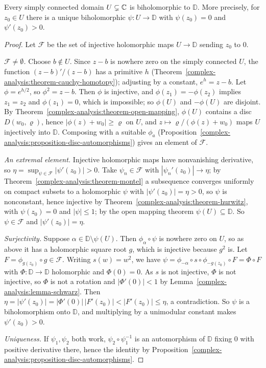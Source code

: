 \begin{theorem}\label{complex-analysis:theorem-riemann-mapping}
Every simply connected domain $U \subsetneq \mathbb{C}$ is biholomorphic to $\mathbb{D}$. More precisely, for $z_0 \in U$ there is a unique biholomorphic $\psi \colon U \to \mathbb{D}$ with $\psi(z_0) = 0$ and
$\psi'(z_0) > 0$.
\end{theorem}

\begin{proof}
Let $\mathcal{F}$ be the set of injective holomorphic maps $U \to \mathbb{D}$ sending $z_0$ to $0$.

\emph{$\mathcal{F} \neq \emptyset$.} Choose $b \notin U$. Since $z - b$ is nowhere zero on the simply connected $U$, the function $(z - b)'/(z - b)$ has a primitive $h$
(Theorem~\ref{complex-analysis:theorem-cauchy-homotopy}); adjusting by a constant, $e^{h} = z - b$. Let $\phi = e^{h/2}$, so $\phi^2 = z - b$. Then $\phi$ is injective, and $\phi(z_1) = -\phi(z_2)$ implies
$z_1 = z_2$ and $\phi(z_1) = 0$, which is impossible; so $\phi(U)$ and $-\phi(U)$ are disjoint. By Theorem~\ref{complex-analysis:theorem-open-mapping}, $\phi(U)$ contains a disc $D(w_0, \varrho)$, hence
$|\phi(z) + w_0| \geq \varrho$ on $U$, and $z \mapsto \varrho/(\phi(z) + w_0)$ maps $U$ injectively into $\mathbb{D}$. Composing with a suitable $\phi_a$
(Proposition~\ref{complex-analysis:proposition-disc-automorphisms}) gives an element of $\mathcal{F}$.

\emph{An extremal element.} Injective holomorphic maps have nonvanishing derivative, so $\eta = \sup_{\psi \in \mathcal{F}}|\psi'(z_0)| > 0$. Take $\psi_n \in \mathcal{F}$ with $|\psi_n'(z_0)| \to \eta$; by
Theorem~\ref{complex-analysis:theorem-montel} a subsequence converges uniformly on compact subsets to a holomorphic $\psi$ with $|\psi'(z_0)| = \eta > 0$, so $\psi$ is nonconstant, hence injective by
Theorem~\ref{complex-analysis:theorem-hurwitz}, with $\psi(z_0) = 0$ and $|\psi| \leq 1$; by the open mapping theorem $\psi(U) \subseteq \mathbb{D}$. So $\psi \in \mathcal{F}$ and $|\psi'(z_0)| = \eta$.

\emph{Surjectivity.} Suppose $\alpha \in \mathbb{D} \setminus \psi(U)$. Then $\phi_\alpha \circ \psi$ is nowhere zero on $U$, so as above it has a holomorphic square root $g$, which is injective because
$g^2$ is. Let $F = \phi_{g(z_0)} \circ g \in \mathcal{F}$. Writing $s(w) = w^2$, we have $\psi = \phi_{-\alpha} \circ s \circ \phi_{-g(z_0)} \circ F = \Phi \circ F$ with $\Phi \colon \mathbb{D} \to \mathbb{D}$
holomorphic and $\Phi(0) = 0$. As $s$ is not injective, $\Phi$ is not injective, so $\Phi$ is not a rotation and $|\Phi'(0)| < 1$ by Lemma~\ref{complex-analysis:lemma-schwarz}. Then
$\eta = |\psi'(z_0)| = |\Phi'(0)|\,|F'(z_0)| < |F'(z_0)| \leq \eta$, a contradiction. So $\psi$ is a biholomorphism onto $\mathbb{D}$, and multiplying by a unimodular constant makes $\psi'(z_0) > 0$.

\emph{Uniqueness.} If $\psi_1, \psi_2$ both work, $\psi_2 \circ \psi_1^{-1}$ is an automorphism of $\mathbb{D}$ fixing $0$ with positive derivative there, hence the identity by
Proposition~\ref{complex-analysis:proposition-disc-automorphisms}.
\end{proof}

